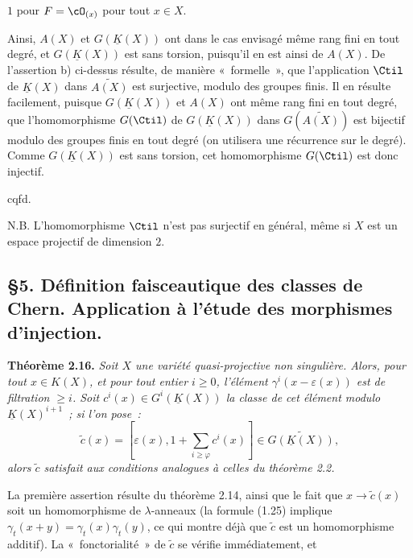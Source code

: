 $1$
pour $F=\cO_{(x)}$ pour tout $x\in X$.

Ainsi, $A(X)$ et $G(\underline K(X))$ ont dans le cas envisagé même rang fini en tout degré, et $G(\underline K(X))$ est sans torsion, puisqu'il en est ainsi de $A(X)$. De l'assertion b) ci-dessus résulte, de manière «~formelle~», que l'application $\Ctil$ de $\underline K(X)$ dans $\widetilde{A(X)}$ est surjective, modulo des groupes finis. Il en résulte facilement, puisque $G(\underline K(X))$ et $A(X)$ ont même rang fini en tout degré, que l'homomorphisme $G(\Ctil)$ de $G(\underline K(X))$ dans $G(\widetilde{A(X)})$ est bijectif modulo des groupes finis en tout degré (on utilisera une récurrence sur le degré). Comme $G(\underline K(X))$ est sans torsion, cet homomorphisme $G(\Ctil)$ est donc injectif.
\begin{flushright}cqfd.\end{flushright}

N.B. L'homomorphisme $\Ctil$ n'est pas surjectif en général, même si $X$ est un espace projectif de dimension $2$.

\subsection*{\S 5. Définition faisceautique des classes de Chern. Application à l'étude des morphismes d'injection.}

\textbf{Théorème 2.16.} \emph{Soit $X$ une variété quasi-projective non singulière. Alors, pour tout $x\in K(X)$, et pour tout entier $i\geq0$, l'élément $\gamma^i(x-\varepsilon(x))$ est de filtration $\geq i$. Soit $c^i(x)\in G^i(\underline K(X))$ la classe de cet élément modulo $\underline K(X)^{i+1}$~; si l'on pose~:}
\[
 \widetilde c(x)=\left[\varepsilon(x),1+\sum_{i\geq\varphi}c^i(x)\right]\in\widetilde{G(\underline K(X))},
\]
\emph{alors $\widetilde c$ satisfait aux conditions analogues à celles du théorème 2.2.}

La première assertion résulte du théorème 2.14, ainsi que le fait que $x\longrightarrow\widetilde c(x)$ soit un homomorphisme de $\lambda$-anneaux (la formule (1.25) implique $\gamma_t(x+y)=\gamma_t(x)\gamma_t(y)$, ce qui montre déjà que $\widetilde c$ est un homomorphisme additif). La «~fonctorialité~» de $\widetilde c$ se vérifie immédiatement, et 
